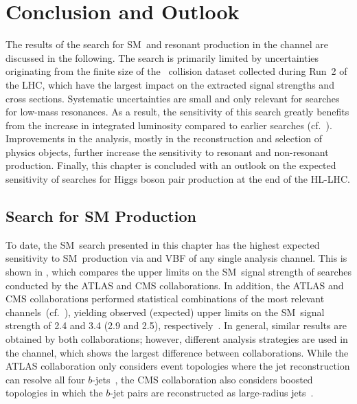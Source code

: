 \section{Conclusion and Outlook}%
\label{sec:result_discussion}

The results of the search for SM~\HH and resonant \HH production in the
\bbtautau channel are discussed in the following. The search is primarily
limited by uncertainties originating from the finite size of the \pp~collision
dataset collected during Run~2 of the LHC, which have the largest impact on the
extracted signal strengths and cross sections. Systematic uncertainties are
small and only relevant for searches for low-mass resonances. As a result, the
sensitivity of this search greatly benefits from the increase in integrated
luminosity compared to earlier searches
(cf.~). Improvements in the analysis, mostly in
the reconstruction and selection of physics objects, further increase the
sensitivity to resonant and non-resonant \HH production. Finally, this chapter
is concluded with an outlook on the expected sensitivity of searches for Higgs
boson pair production at the end of the HL-LHC.

\subsection{Search for SM \HH Production}

To date, the SM~\HH search presented in this chapter has the highest expected
sensitivity to SM~\HH production via \ggF and VBF of any single analysis
channel. This is shown in , which compares the upper
limits on the SM~\HH signal strength of searches conducted by the ATLAS and CMS
collaborations. In addition, the ATLAS and CMS collaborations performed
statistical combinations of the most relevant
channels~(cf.~), yielding observed (expected) upper
limits on the SM~\HH signal strength of 2.4 and 3.4 (2.9 and 2.5),
respectively~\cite{HDBS-2022-03,CMS-HIG-22-001}.
In general, similar results are obtained by both collaborations; however,
different analysis strategies are used in the \bbbb channel, which shows the
largest difference between collaborations. While the ATLAS collaboration only
considers event topologies where the jet reconstruction can resolve all four
$b$-jets~\cite{ATLAS-CONF-2022-035}, the CMS collaboration also considers
boosted topologies in which the $b$-jet pairs are reconstructed as large-radius
jets~\cite{CMS-HIG-20-005,CMS-B2G-22-003}.

